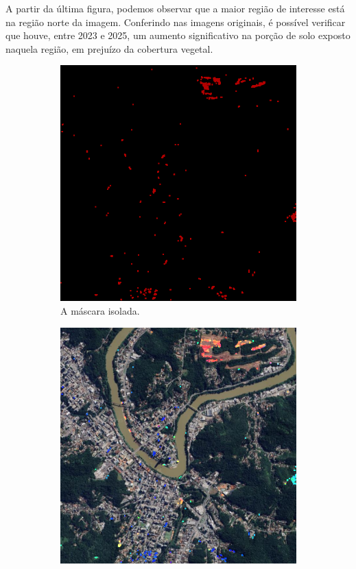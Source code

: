 \documentclass{article}
\begin{document}
A partir da última figura, podemos observar que a maior região de interesse está na região norte da imagem. Conferindo nas imagens originais, é possível verificar que houve, entre 2023 e 2025, um aumento significativo na porção de solo exposto naquela região, em prejuízo da cobertura vegetal.

\begin{figure}[H]
    \centering
    \begin{subfigure}[b]{0.48\textwidth}
        \includegraphics[width=\textwidth]{../Imagens/resultado01_mask.png}
        \caption{A máscara isolada.}
        \label{2025}
    \end{subfigure}
    \hfill %
    \begin{subfigure}[b]{0.48\textwidth}
        \includegraphics[width=\textwidth]{../Imagens/012025_mask.png}

\end{subfigure}
\end{figure}
\end{document}

